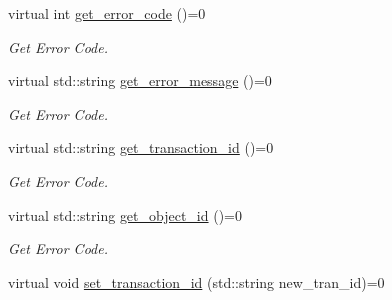 \begin{DoxyCompactItemize}
\item 
\hypertarget{classApplicationResponseInterface_a189b3e716d61a18af3fc10cfbf4d84bf}{virtual int \hyperlink{classApplicationResponseInterface_a189b3e716d61a18af3fc10cfbf4d84bf}{get\-\_\-error\-\_\-code} ()=0}\label{classApplicationResponseInterface_a189b3e716d61a18af3fc10cfbf4d84bf}

\begin{DoxyCompactList}\small\item\em Get Error Code. \end{DoxyCompactList}\item 
\hypertarget{classApplicationResponseInterface_afb75df1b564d4a5dcab412ba54ea05c1}{virtual std\-::string \hyperlink{classApplicationResponseInterface_afb75df1b564d4a5dcab412ba54ea05c1}{get\-\_\-error\-\_\-message} ()=0}\label{classApplicationResponseInterface_afb75df1b564d4a5dcab412ba54ea05c1}

\begin{DoxyCompactList}\small\item\em Get Error Code. \end{DoxyCompactList}\item 
\hypertarget{classApplicationResponseInterface_a46c3d8c03f59b2b1c4bfd0bcf5ce68fb}{virtual std\-::string \hyperlink{classApplicationResponseInterface_a46c3d8c03f59b2b1c4bfd0bcf5ce68fb}{get\-\_\-transaction\-\_\-id} ()=0}\label{classApplicationResponseInterface_a46c3d8c03f59b2b1c4bfd0bcf5ce68fb}

\begin{DoxyCompactList}\small\item\em Get Error Code. \end{DoxyCompactList}\item 
\hypertarget{classApplicationResponseInterface_aef027cbc8df2a19da2e4cfd8bee5be58}{virtual std\-::string \hyperlink{classApplicationResponseInterface_aef027cbc8df2a19da2e4cfd8bee5be58}{get\-\_\-object\-\_\-id} ()=0}\label{classApplicationResponseInterface_aef027cbc8df2a19da2e4cfd8bee5be58}

\begin{DoxyCompactList}\small\item\em Get Error Code. \end{DoxyCompactList}\item 
\hypertarget{classApplicationResponseInterface_a48a62daa244d77b8a7c9d018f92d39d1}{virtual void \hyperlink{classApplicationResponseInterface_a48a62daa244d77b8a7c9d018f92d39d1}{set\-\_\-transaction\-\_\-id} (std\-::string new\-\_\-tran\-\_\-id)=0}\label{classApplicationResponseInterface_a48a62daa244d77b8a7c9d018f92d39d1}


\end{DoxyCompactItemize}
